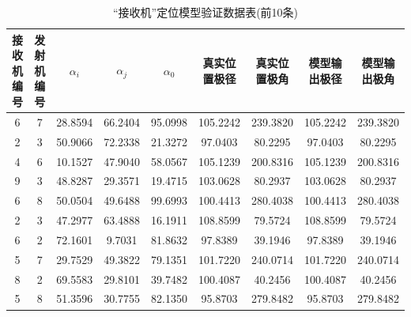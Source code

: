 \documentclass[withoutpreface,bwprint]{cumcmthesis} %
\begin{document}
				\begin{table}[htbp!]
					\small
					\caption{“接收机”定位模型验证数据表(前10条)}
					\centering
					\tabcolsep=0.1cm
					\begin{tabular}{@{}ccccccccc@{}}
						\toprule
						\textbf{接收机编号} & \textbf{发射机编号} & \textbf{$\alpha_{i}$} & \textbf{$\alpha_{j}$} & \textbf{$\alpha_{0}$} & \textbf{真实位置极径} & \textbf{真实位置极角} & \textbf{模型输出极径} & \textbf{模型输出极角} \\ \midrule
						6              & 7              & 28.8594     & 66.2404     & 95.0998     & 105.2242        & 239.3820        & 105.2242        & 239.3820        \\
						2              & 3              & 50.9066     & 72.2338     & 21.3272     & 97.0403         & 80.2295         & 97.0403         & 80.2295         \\
						4              & 6              & 10.1527     & 47.9040     & 58.0567     & 105.1239        & 200.8316        & 105.1239        & 200.8316        \\
						9              & 3              & 48.8287     & 29.3571     & 19.4715     & 103.0628        & 80.2937         & 103.0628        & 80.2937         \\
						6              & 8              & 50.0504     & 49.6488     & 99.6993     & 100.4413        & 280.4038        & 100.4413        & 280.4038        \\
						2              & 3              & 47.2977     & 63.4888     & 16.1911     & 108.8599        & 79.5724         & 108.8599        & 79.5724         \\
						6              & 2              & 72.1601     & 9.7031      & 81.8632     & 97.8389         & 39.1946         & 97.8389         & 39.1946         \\
						5              & 7              & 29.7529     & 49.3822     & 79.1351     & 101.7220        & 240.0714        & 101.7220        & 240.0714        \\
						8              & 2              & 69.5583     & 29.8101     & 39.7482     & 100.4087        & 40.2456         & 100.4087        & 40.2456         \\
						5              & 8              & 51.3596     & 30.7755     & 82.1350     & 95.8703         & 279.8482        & 95.8703         & 279.8482        \\ \bottomrule
					\end{tabular}
				\end{table}
			
\end{document}
